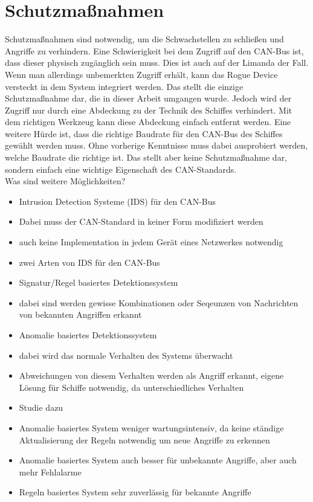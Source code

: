 \section{Schutzmaßnahmen}
Schutzmaßnahmen sind notwendig, um die Schwachstellen zu schließen und Angriffe zu verhindern.
Eine Schwierigkeit bei dem Zugriff auf den CAN-Bus ist, dass dieser physisch zugänglich sein muss. Dies ist auch auf der Limanda
der Fall. Wenn man allerdings unbemerkten Zugriff erhält, kann das Rogue Device versteckt in dem System integriert werden. 
Das stellt die einzige Schutzmaßnahme dar, die in dieser Arbeit umgangen wurde. Jedoch wird der Zugriff nur durch eine Abdeckung zu der Technik des Schiffes
verhindert. Mit dem richtigen Werkzeug kann diese Abdeckung einfach entfernt werden.
Eine weitere Hürde ist, dass die richtige Baudrate für den CAN-Bus des Schiffes gewählt werden muss. Ohne vorherige Kenntnisse
muss dabei ausprobiert werden, welche Baudrate die richtige ist. Das stellt aber keine Schutzmaßnahme dar, sondern einfach
eine wichtige Eigenschaft des CAN-Standards.\\

Was sind weitere Möglichkeiten?
\begin{itemize}
    \item Intrusion Detection Systeme (IDS) für den CAN-Bus
    \item Dabei muss der CAN-Standard in keiner Form modifiziert werden
    \item auch keine Implementation in jedem Gerät eines Netzwerkes notwendig
\end{itemize}
\cite{Gmiden2016}
\begin{itemize}
    \item zwei Arten von IDS für den CAN-Bus
    \item Signatur/Regel basiertes Detektionssystem
    \item dabei sind werden gewisse Kombinationen oder Seqeunzen von Nachrichten von bekannten Angriffen erkannt
    \item Anomalie basiertes Detektionssystem
    \item dabei wird das normale Verhalten des Systems überwacht
    \item Abweichungen von diesem Verhalten werden als Angriff erkannt, eigene Lösung für Schiffe notwendig, da unterschiedliches Verhalten
    \item Studie dazu \cite{Davieds2024}
    \item Anomalie basiertes System weniger wartungsintensiv, da keine ständige Aktualisierung der Regeln notwendig um neue Angriffe zu erkennen
    \item Anomalie basiertes System auch besser für unbekannte Angriffe, aber auch mehr Fehlalarme
    \item Regeln basiertes System sehr zuverlässig für bekannte Angriffe
\end{itemize}
\cite{Hoppe2009}

